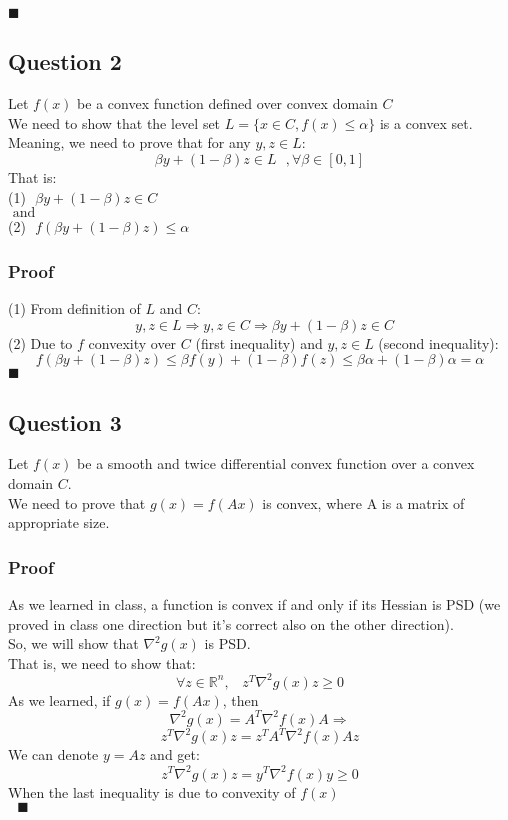 \documentclass{article}
\newcommand{\qed}{\hfill$\blacksquare$}
\begin{document}
\qed\\
\subsection{Question 2}
Let $f(x)$ be a convex function defined over convex domain $C$\\
We need to show that the level set $L = \{x \in C, f(x) \leq \alpha \}$ is a convex set.
Meaning, we need to prove that for any $y,z \in L$:
$$\beta y + (1-\beta)z \in L \:\:\:, \forall \beta \in [0,1]$$
That is:\\
(1)$\:\:\:\beta y + (1-\beta)z \in C$\\
$\text{ and }$\\
(2)$\:\:\:f(\beta y + (1-\beta)z) \leq \alpha$
\subsubsection*{Proof}
(1) From definition of $L$ and $C$:
$$\:\:\: y,z \in L \Rightarrow y,z \in C \Rightarrow \beta y + (1-\beta)z \in C$$
(2) Due to $f$ convexity over $C$ (first inequality) and $y,z \in L$ (second inequality):
$$f(\beta y + (1-\beta)z) \leq \beta f(y) + (1-\beta)f(z) \leq  \beta \alpha  + (1-\beta)\alpha = \alpha$$
\qed\\

\newpage
\subsection{Question 3}
Let $f(x)$ be a smooth and twice differential convex function over a convex domain $C$.\\
We need to prove that $g(x) = f(Ax)$ is convex, where A is a matrix of appropriate size.
\subsubsection*{Proof}
As we learned in class, a function is convex if and only if its Hessian is PSD (we proved in class one direction but it's correct also on the other direction).\\
So, we will show that $\nabla^2 g(x)$ is PSD.\\
That is, we need to show that:
$$\forall z \in \mathbb{R}^n, \;\;\; z^T \nabla^2 g(x) z \geq 0$$
As we learned, if $g(x) = f(Ax)$, then 
$$\nabla^2 g(x) = A^T \nabla^2 f(x) A \Rightarrow$$
$$z^T \nabla^2 g(x) z = z^T A^T \nabla^2 f(x) A z$$
We can denote $y = Az$ and get:
$$z^T \nabla^2 g(x) z = y^T \nabla^2 f(x) y \geq 0$$
When the last inequality is due to convexity of $f(x)$\\
$\text{ }$\qed
\end{document}
